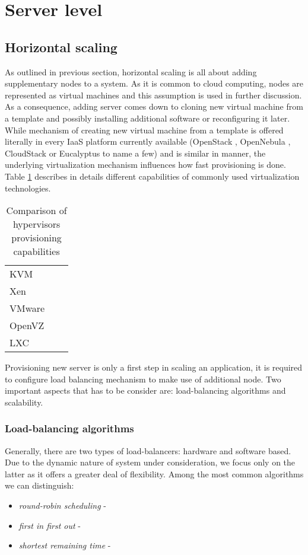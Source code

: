 \section{Server level}

\subsection{Horizontal scaling}
As outlined in previous section, horizontal scaling is all about adding supplementary nodes to a system. As it is common to cloud computing, nodes are represented as virtual machines and this assumption is used in further discussion. As a consequence, adding server comes down to cloning new virtual machine from a template and possibly installing additional software or reconfiguring it later. While mechanism of creating new virtual machine from a template is offered literally in every IaaS platform currently available (OpenStack \cite{OpenStack}, OpenNebula \cite{OpenNebula}, CloudStack \cite{CloudStack} or Eucalyptus \cite{Eucalyptus} to name a few) and is similar in manner, the underlying virtualization mechanism influences how fast provisioning is done. Table \ref{tab:hypervisors-provisioning} describes in details different capabilities of commonly used virtualization technologies.

\begin{table}[!htbp]
\begin{tabularx}{\textwidth}{l | X | X}
 &  & \\
\hline 
KVM &  & \\
\hline
Xen &  & \\
\hline
VMware &  & \\
\hline
OpenVZ &  & \\
\hline
LXC &  &  \\
\end{tabularx}
\caption{Comparison of hypervisors provisioning capabilities}
\label{tab:hypervisors-provisioning}
\end{table}

Provisioning new server is only a first step in scaling an application, it is required to configure load balancing mechanism to make use of additional node. Two important aspects that has to be consider are: load-balancing algorithms and scalability.

\subsubsection*{Load-balancing algorithms}
Generally, there are two types of load-balancers: hardware and software based. Due to the dynamic nature of system under consideration, we focus only on the latter as it offers a greater deal of flexibility. Among the most common algorithms we can distinguish:
\begin{itemize}
 \item \textit{round-robin scheduling} -
 \item \textit{first in first out} -
 \item \textit{shortest remaining time} -
\end{itemize}


